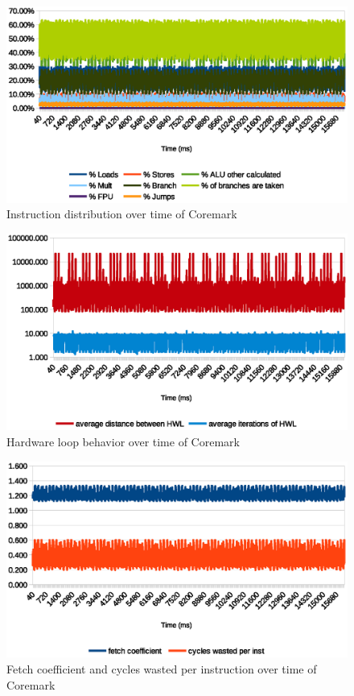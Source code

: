 \documentclass[../bachelor_paper.tex]{subfiles}
\begin{document}
\begin{figure}
    \centering
    \includegraphics[width=\textwidth]{img/graph/coremark/coremark_inst.eps}
    \caption{Instruction distribution over time of Coremark}
    \label{fig:res/coremark/inst}
\end{figure}

\begin{figure}
    \centering
    \includegraphics[width=\textwidth]{img/graph/coremark/coremark_hwl.eps}
    \caption{Hardware loop behavior over time of Coremark}
    \label{fig:res/coremark/hwl}
\end{figure}

\begin{figure}
    \centering
    \includegraphics[width=\textwidth]{img/graph/coremark/coremark_fetch_waste.eps}
    \caption{Fetch coefficient and cycles wasted per instruction over time of Coremark}
    \label{fig:res/coremark/fetch_waste}
\end{figure}

\isstandalone



\fi
\end{document}
